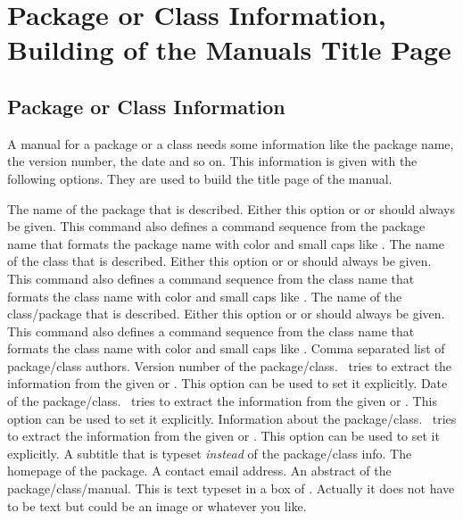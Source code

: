\documentclass[load-preamble]{cnltx-doc}
\begin{document}
  
\section{Package or Class Information,  Building of the Manuals Title Page}
\subsection{Package or Class Information}

A manual for a package or a class needs some information like the package
name, the version number, the date and so on.  This information is given with
the following options.  They are used to build the title page of the manual.
\begin{options}
    The name of the package that is described.  Either this option or
     or  should always be given.  This command also
    defines a command sequence from the package name that formats the package
    name with color and small caps like \cnltx.
    The name of the class that is described.  Either this option or
     or  should always be given.  This command
    also defines a command sequence from the class name that formats the class
    name with color and small caps like \cnltx.
    The name of the class/package that is described.  Either this option or
     or  should always be given.  This command
    also defines a command sequence from the class name that formats the class
    name with color and small caps like \cnltx.
    Comma separated list of package/class authors.
    Version number of the package/class.  \cnltx\ tries to extract the
    information from the given  or .  This
    option can be used to set it explicitly.
    Date of the package/class.  \cnltx\ tries to extract the
    information from the given  or .  This
    option can be used to set it explicitly.
    Information about the package/class.  \cnltx\ tries to extract the
    information from the given  or .  This
    option can be used to set it explicitly.
    A subtitle that is typeset \emph{instead} of the package/class info.
    The homepage of the package.
    A contact email address.
    An abstract of the package/class/manual.  This is text typeset in a box of
    .  Actually it does not have to be text but could
      be an image or whatever you like.
\end{options}
\end{document}
